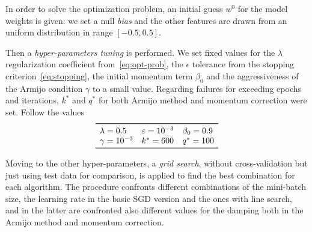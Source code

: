 In order to solve the optimization problem, an initial guess $w^0$ for the model weights is given: we set a null \emph{bias} and the other features are drawn from an uniform distribution in range $[-0.5,0.5]$.

Then a \emph{hyper-parameters tuning} is performed. We set fixed values for the $\lambda$ regularization coefficient from~\eqref{eq:opt-prob}, the $\epsilon$ tolerance from the stopping criterion~\eqref{eq:stopping}, the initial momentum term $\beta_0$ and the aggressiveness of the Armijo condition $\gamma$ to a small value. Regarding failures for exceeding epochs and iterations, $k^\ast$ and $q^\ast$ for both Armijo method and momentum correction were set. Follow the values
\[
\begin{array}{lll}
\toprule
\lambda=0.5 & \epsilon=\num{e-3} & \beta_0=0.9 \\
\gamma=\num{e-3} & k^\ast=600 & q^\ast=100 \\
\bottomrule
\end{array}
\]

Moving to the other hyper-parameters, a \emph{grid search}, without cross-validation but just using test data for comparison, is applied to find the best combination for each algorithm. The procedure confronts different combinations of the mini-batch size, the learning rate in the basic SGD version and the ones with line search, and in the latter are confronted also different values for the damping both in the Armijo method and momentum correction.

